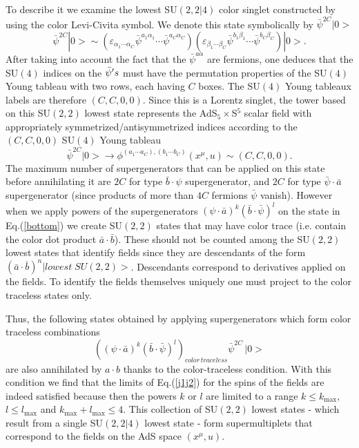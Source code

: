 \documentclass[a4paper,aps,preprint,nofootinbib]{revtex4}
\begin{document}
To describe it we examine the lowest SU$\left( 2,2|4\right) $ color singlet
constructed by using the color Levi-Civita symbol. We denote this state
symbolically by $\bar{\psi}^{2C}|0>$%
\begin{equation}
\bar{\psi}^{2C}|0>\sim\left( \varepsilon_{\alpha_{1}\cdots\alpha_{C}}\bar{
\psi}^{a_{1}\alpha_{1}}\cdots\bar{\psi}^{a_{C}\alpha_{C}}\right) \left(
\varepsilon_{\beta_{1}\cdots\beta_{C}}\bar{\psi}^{b_{1}\beta_{1}}\cdots \bar{
\psi}^{b_{C}\beta_{C}}\right) |0>.  \label{bottom}
\end{equation}
After taking into account the fact that the $\bar{\psi}^{a\alpha}$ are
fermions, one deduces that the SU$\left( 4\right) $ indices on the $\bar{%
\psi }^{\prime}s$ must have the permutation properties of the SU$\left(
4\right) $ Young tableau with two rows, each having $C$ boxes. The SU$\left(
4\right) $ Young tableaux labels are therefore $\left( C,C,0,0\right) .$
Since this is a Lorentz singlet, the tower based on this SU$\left(
2,2\right) $ lowest state represents the AdS$_{5}\times$S$^{5}$ scalar field
with appropriately symmetrized/antisymmetrized indices according to the $%
\left( C,C,0,0\right) $ SU$\left( 4\right) $ Young tableau
\begin{equation}
\bar{\psi}^{2C}|0>\rightarrow\phi^{(a_{1}\cdots a_{C}),(b_{1}\cdots
b_{C})}\left( x^{\mu},u\right) \sim\left( C,C,0,0\right) .
\end{equation}
The maximum number of supergenerators that can be applied on this state
before annihilating it are $2C$ for type $\bar{b}\cdot\psi$ supergenerator,
and $2C$ for type $\bar{\psi}\cdot\bar{a}$ supergenerator (since products of
more than $4C$ fermions $\bar{\psi}$ vanish). However when we apply powers
of the supergenerators $\left( \psi\cdot\bar{a}\right) ^{k}\left( \bar{b}
\cdot \bar{\psi}\right) ^{l}$ on the state in Eq.(\ref{bottom}) we create SU$%
\left( 2,2\right)$ states that may have color trace (i.e. contain the color
dot product $\bar{a}\cdot\bar{b}$). These should not be counted among the SU$%
\left( 2,2\right) $ lowest states that identify fields since they are
descendants of the form $\left( \bar{a}\cdot\bar{b}\right)
^{n}|lowest\;SU\left( 2,2\right) >$. Descendants correspond to derivatives
applied on the fields. To identify the fields themselves uniquely one must
project to the color traceless states only.

Thus, the following states obtained by applying supergenerators which form
color traceless combinations
\begin{equation}
\left( \left( \psi\cdot\bar{a}\right) ^{k}\left( \bar{b}\cdot\bar{\psi }%
\right) ^{l}\right) _{color\,traceless}\bar{\psi}^{2C}\,|0>  \label{lowest}
\end{equation}
are also annihilated by $a\cdot b$ thanks to the color-traceless condition.
With this condition we find that the limits of Eq.(\ref{j1j2}) for the spins
of the fields are indeed satisfied because then the powers $k$ or $l$ are
limited to a range $k\leq k_{\max},$ $l\leq l_{\max}$ and $k_{\max}+l_{\max
}\leq4.$ This collection of SU$\left( 2,2\right) $ lowest states - which
result from a single SU$\left( 2,2|4\right) $ lowest state - form
supermultiplets that correspond to the fields on the AdS space $\left(
x^{\mu},u\right) $.
\end{document}
